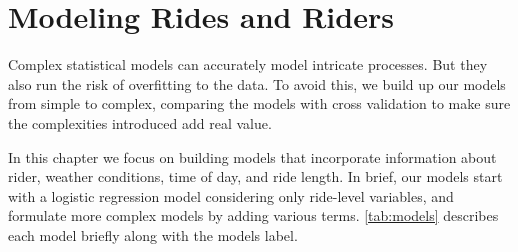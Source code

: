 \documentclass[]{article}
\title{}
\author{}
\date{}
\begin{document}
\section{Modeling Rides and Riders}\label{model-chapter}

Complex statistical models can accurately model intricate processes. But
they also run the risk of overfitting to the data. To avoid this, we
build up our models from simple to complex, comparing the models with
cross validation to make sure the complexities introduced add real
value.

In this chapter we focus on building models that incorporate information
about rider, weather conditions, time of day, and ride length. In brief,
our models start with a logistic regression model considering only
ride-level variables, and formulate more complex models by adding
various terms. \autoref{tab:models} describes each model briefly along
with the models label.
\end{document}
